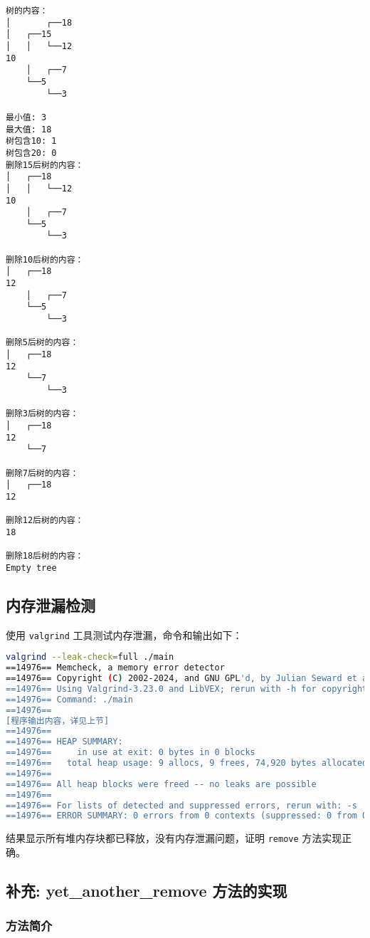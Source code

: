 \documentclass[UTF8]{ctexart}
\begin{document}
\begin{lstlisting}[language={}, caption=程序输出]
树的内容：
│       ┌──18
│   ┌──15
│   │   └──12
10
    │   ┌──7
    └──5
        └──3

最小值: 3
最大值: 18
树包含10: 1
树包含20: 0
删除15后树的内容：
│   ┌──18
│   │   └──12
10
    │   ┌──7
    └──5
        └──3

删除10后树的内容：
│   ┌──18
12
    │   ┌──7
    └──5
        └──3

删除5后树的内容：
│   ┌──18
12
    └──7
        └──3

删除3后树的内容：
│   ┌──18
12
    └──7

删除7后树的内容：
│   ┌──18
12

删除12后树的内容：
18

删除18后树的内容：
Empty tree
\end{lstlisting}

\subsection{内存泄漏检测}

使用 \verb|valgrind| 工具测试内存泄漏，命令和输出如下：

\begin{lstlisting}[language=bash, caption=Valgrind 输出]
valgrind --leak-check=full ./main
==14976== Memcheck, a memory error detector
==14976== Copyright (C) 2002-2024, and GNU GPL'd, by Julian Seward et al.
==14976== Using Valgrind-3.23.0 and LibVEX; rerun with -h for copyright info
==14976== Command: ./main
==14976== 
[程序输出内容，详见上节]
==14976== 
==14976== HEAP SUMMARY:
==14976==     in use at exit: 0 bytes in 0 blocks
==14976==   total heap usage: 9 allocs, 9 frees, 74,920 bytes allocated
==14976== 
==14976== All heap blocks were freed -- no leaks are possible
==14976== 
==14976== For lists of detected and suppressed errors, rerun with: -s
==14976== ERROR SUMMARY: 0 errors from 0 contexts (suppressed: 0 from 0)
\end{lstlisting}

结果显示所有堆内存块都已释放，没有内存泄漏问题，证明 \verb|remove| 方法实现正确。

\subsection{补充: yet\_another\_remove 方法的实现}

\subsubsection{方法简介}
\end{document}
